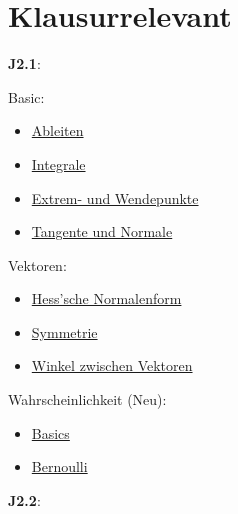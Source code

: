 \chapter{Klausurrelevant}
\textbf{J2.1}: 

Basic:
\begin{multicols}{2}
    \begin{itemize}
        \item \hyperref[sec:ableiten]{Ableiten}
        \item \hyperref[sec:integrale]{Integrale} 
        \item \hyperref[sec:extremundwendepunkte]{Extrem- und Wendepunkte}
        \item \hyperref[sec:tangenteundnormale]{Tangente und Normale}
    \end{itemize}
\end{multicols}

Vektoren:
\begin{multicols}{2}
    \begin{itemize}
        \item \hyperref[sec:hessscheform]{Hess'sche Normalenform}
        \item \hyperref[sec:symmetrie]{Symmetrie}
        \item \hyperref[sec:winkel_vektoren]{Winkel zwischen Vektoren}
    \end{itemize}
\end{multicols}

Wahrscheinlichkeit (Neu):
\begin{multicols}{2}
    \begin{itemize}
        \item \hyperref[sec:elemkombinatorik]{Basics}
        \item \hyperref[sec:bernoulli]{Bernoulli}
    \end{itemize}
\end{multicols}

\vspace{0.4cm}

\textbf{J2.2}:
